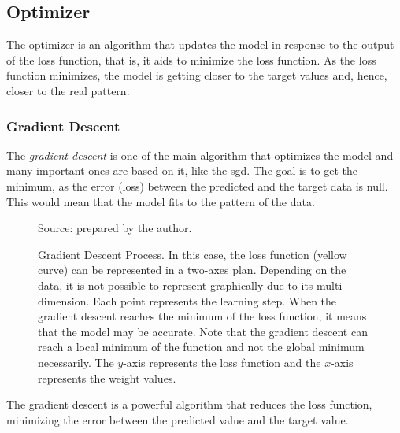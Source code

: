 
\subsection{Optimizer}\label{sec:optimizer}

The optimizer is an algorithm that updates the model in response to the output of the loss function, that is, it aids to minimize the loss function. 
As the loss function minimizes, the model is getting closer to the target values and, hence, closer to the real pattern.

\subsubsection*{Gradient Descent} 

The \emph{gradient descent} is one of the main algorithm \citep{nesterov2004} that optimizes the model and many important ones are based on it, like the \gls*{sgd}. 
The goal is to get the minimum, as the error (loss) between the predicted and the target data is null. 
This would mean that the model fits to the pattern of the data.
%
\begin{figure}[!htb]
    \centering
    \caption[Gradient Descent Process]{Gradient Descent Process. In this case, the loss function (yellow curve) can be represented in a two-axes plan. Depending on the data, it is not possible to represent graphically due to its multi dimension. Each point represents the learning step. When the gradient descent reaches the minimum of the loss function, it means that the model may be accurate. Note that the gradient descent can reach a local minimum of the function and not the global minimum necessarily. The \(y\)-axis represents the loss function and the \(x\)-axis represents the weight values.}
    
    
    {\footnotesize Source: prepared by the author.}
    
\end{figure}

The gradient descent is a powerful algorithm that reduces the loss function, minimizing the error between the predicted value and the target value.

